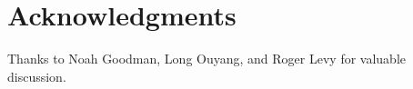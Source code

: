 \documentclass[10pt,letterpaper]{article}
\begin{document}






\section{Acknowledgments}

Thanks to Noah Goodman, Long Ouyang, and Roger Levy for valuable discussion.



\setlength{\bibleftmargin}{.125in}
\setlength{\bibindent}{-\bibleftmargin}


\end{document}
